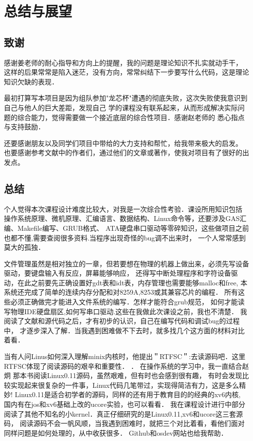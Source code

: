 \chapter{总结与展望} 

\section{致谢}
感谢姜老师的耐心指导和方向上的提醒，我的问题是理论知识不扎实就动手干，
这样的后果常常是陷入迷茫，没有方向，常常纠结下一步要写什么代码，这是理论知识欠缺的表现．

最初打算写本项目是因为组队参加"龙芯杯"遭遇的彻底失败，这次失败使我意识到自己与他人的巨大差距，发现自己
学的课程没有联系起来，从而形成解决实际问题的综合能力，觉得需要做一个接近底层的综合性项目．感谢赵老师的
悉心指点与支持鼓励．

还要感谢朋友以及同学们项目中带给的大力支持和帮忙，给我带来极大的启发。
也要感谢参考文献中的作者们，通过他们的文章或著作，使我对项目有了很好的出发点。

\section{总结}

个人觉得本次课程设计难度比较大，对我是一次综合性考验．课设所用知识包括
操作系统原理、微机原理、汇编语言、数据结构、Linux命令等，还要涉及GAS汇编、Makefile编写、GRUB格式、
ATA硬盘串口驱动等零碎知识，这些做项目之前也都不懂,需要查阅很多资料.当程序出现奇怪的bug调不出来时，
一个人常常感到莫大的孤独．

文件管理虽然是相对独立的一章，但若要想在物理的机器上做出来，必须先写设备驱动，要键盘输入有反应，屏幕能够响应，
还得写中断处理程序和字符设备驱动，在此之前要先正确设置好gdt表和idt表，内存管理也需要能够malloc和free,
本系统还完成了简单的连续内存分配和对8259A,8253或其兼容芯片的编程．
所有这些必须正确做完才能进入文件系统的编写．怎样才能符合grub规范，
如何才能读写物理IDE硬盘扇区,如何写串口驱动.这些在我做此次课设之前，我也不清楚．
我阅读了文献和源代码之后，才有初步的认识，自己在编写代码和调试bug的过程中，
才逐步深入了解．当我遇到困难做不下去时，就多找几个这方面的材料对比着看．

当有人问Linus如何深入理解minix内核时，他提出＂RTFSC＂:去读源码吧．这里RTFSC体现了阅读源码的艰辛和重要性．
．
在操作系统的学习中，我一直结合赵炯 那本书阅读Linux0.11源码，虽然艰难，但有时也会感到很有趣，
有时会发现比较实现起来很复杂的一件事，Linux代码几笔带过，实现得简洁有力，这是多么精妙!
Linux0.11是适合初学者的源码，同样的还有用于教育目的的经典的xv6内核,
国内有在jos和xv6基础上改的ucore实验，也可以看看．
我在课程设计进行中部分阅读了其他不知名的小kernel．真正仔细研究的是Linux0.11,xv6和ucore这三套源码，
阅读源码不会一帆风顺，当我遇到困难时，就把三个对比着看，看他们面对同样问题是如何处理的，从中收获很多．
Github和osdev网站也给我帮助．

